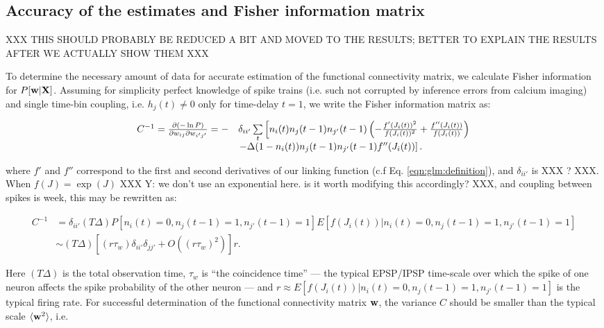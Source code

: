 \subsection{Accuracy of the estimates and Fisher information matrix} \label{sec:methods:accuracy_Fisher}

XXX THIS SHOULD PROBABLY BE REDUCED A BIT AND MOVED TO THE RESULTS;
BETTER TO EXPLAIN THE RESULTS AFTER WE ACTUALLY SHOW THEM XXX

To determine the necessary amount of data for accurate estimation of
the functional connectivity matrix, we calculate Fisher information
for $P[\mathbf{w}| {\bf X}]$. Assuming for simplicity perfect knowledge of spike
trains (i.e. such not corrupted by inference errors from calcium
imaging) and single time-bin coupling, i.e. $h_{j}(t)\neq 0$ only for
time-delay $t=1$, we write the Fisher information matrix as:

\begin{equation}
\begin{array}{rl}
C^{-1}=\frac{\partial (-\ln P)}{\partial \w_{ij}\partial \w_{i'j'}}
=-&\delta_{ii'}\sum\limits_t\left[
n_i(t)n_{j}(t-1)n_{j'}(t-1)\left(-\frac{f'(J_i(t))^2}{f(J_i(t))^2} +
\frac{f''(J_i(t))}{f(J_i(t))}\right) \right. \\
&\left.-\Delta (1-n_i(t))n_{j}(t-1)n_{j'}(t-1)f''(J_i(t))\right].
\end{array}
\end{equation}

 where $f'$ and $f''$ correspond to the first and second derivatives of our linking function (c.f Eq. \ref{eqn:glm:definition}), and $\delta_{ii'}$ is XXX ? XXX.  When $f(J)=\exp(J)$ XXX Y: we don't use an exponential here.  is it worth modifying this accordingly? XXX, and coupling between spikes is week, this may be rewritten as:

\begin{equation}\label{eqn:fisher}
\begin{array}{rl}
C^{-1}
&=\delta_{ii'} (T\Delta) P[n_i(t)=0, n_j(t-1)=1, n_{j'}(t-1)=1]E[f(J_i(t))|n_i(t)=0, n_j(t-1)=1, n_{j'}(t-1)=1] \\
&\sim (T\Delta)\left[(r \tau_w)\delta_{ii'}\delta_{jj'}+O((r \tau_w)^2)\right]r.
\end{array}
\end{equation}

Here $(T\Delta)$ is the total observation time, $ \tau_w$ is ``the coincidence time'' --- the typical EPSP/IPSP time-scale over which the spike of one neuron affects the spike probability of the other neuron --- and $r \approx E[f(J_i(t))|n_i(t)=0, n_j(t-1)=1, n_{j'}(t-1)=1]$ is the typical firing rate.  For successful determination of the functional connectivity matrix $\mathbf{w}$, the variance $C$ should be smaller than the typical scale $\langle \mathbf{w}^2\rangle$, i.e.


